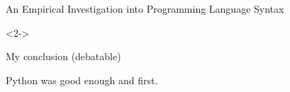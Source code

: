 \documentclass[aspectratio=169]{beamer}
\begin{document}
\begin{frame}{An Empirical Investigation into Programming Language Syntax}
\vspace{-7.6 cm}
\begin{uncoverenv}<2->
\begin{center}
\end{center}
\end{uncoverenv}
\end{frame}

\begin{frame}{My conclusion (debatable)}
\huge
\vspace{1 cm}
\begin{center}
Python was good enough and first.
\end{center}
\end{frame}

\begin{frame}{}


\end{frame}
\end{document}
